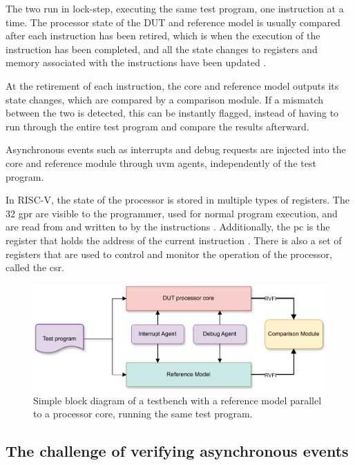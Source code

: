 The two run in lock-step, executing the same test program, one instruction at a time. 
The processor state of the DUT and reference model is usually compared after each instruction has been \gls{retired}, which is when the execution of the instruction has been completed, and all the state changes to registers and memory associated with the instructions have been updated \cite{taylorAdvancedRISCVVerification2023}. 

At the retirement of each instruction, the core and reference model outputs its state changes, which are compared by a comparison module. If a mismatch between the two is detected, this can be instantly flagged, instead of having to run through the entire test program and compare the results afterward. 

Asynchronous events such as interrupts and debug requests are injected into the core and reference module through \acrshort{uvm} agents, independently of the test program.

In RISC-V, the state of the processor is stored in multiple types of registers. The 32 \acrfull{gpr} are visible to the programmer, used for normal program execution, and are read from and written to by the instructions \cite{watermanRISCVInstructionSet2019}. Additionally, the \acrfull{pc} is the register that holds the address of the current instruction \cite{watermanRISCVInstructionSet2019}. There is also a set of registers that are used to control and monitor the operation of the processor, called the \acrfull{csr}. 

\begin{figure}
    \centering
    \includegraphics[width=0.75\linewidth]{figures/ISS_Testbench.pdf}
    \caption{Simple block diagram of a testbench with a reference model parallel to a processor core, running the same test program. }
    \label{fig:testbench_block_diagram}
\end{figure}




\subsection{The challenge of verifying asynchronous events}

